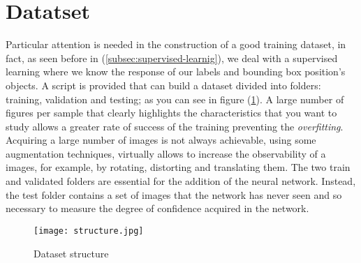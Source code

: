 \section{Datatset}
\label{sec:dataset}
Particular attention is needed in the construction of a good training dataset, 
in fact, as seen before in (\ref{subsec:supervised-learnig}), we deal with a 
supervised learning where we know the response of our labels and bounding box position's objects.
A script is provided that can build a dataset divided into folders: training, 
validation and testing; as you can see in figure (\ref{fig:datasetstructure}).
A large number of figures per sample that clearly highlights the characteristics 
that you want to study allows a greater rate of success of the training 
preventing the \emph{overfitting}.
Acquiring a large number of images is not always achievable, using some 
augmentation techniques, virtually allows to increase the observability of a 
images, for example, by rotating, distorting and translating them.
The two train and validated folders are essential for the addition of the 
neural network.
Instead, the test folder contains a set of images that the network has never 
seen and so necessary to measure the degree of confidence acquired in the network.\linebreak
%
\begin{figure}[htb]
	\centering
	\texttt{[image: structure.jpg]}
	\caption{Dataset structure}
	\label{fig:datasetstructure}
\end{figure}
%
